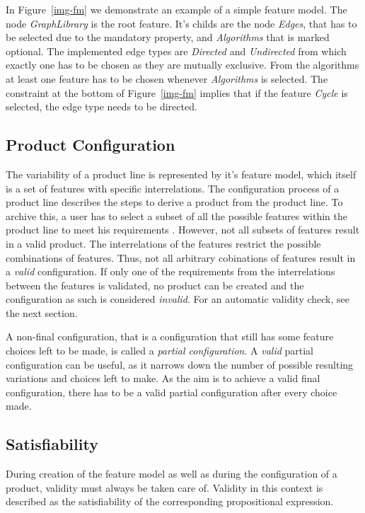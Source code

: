 In Figure~\ref{img-fm} we demonstrate an example of a simple feature model. The node \textit{GraphLibrary} is the root feature. It's childs are the node \textit{Edges}, that has to be selected due to the mandatory property, and \textit{Algorithms} that is marked optional. The implemented edge types are \textit{Directed} and \textit{Undirected} from which exactly one has to be chosen as they are mutually exclusive. From the algorithms at least one feature has to be chosen whenever \textit{Algorithms} is selected. The constraint at the bottom of Figure~\ref{img-fm} implies that if the feature \textit{Cycle} is selected, the edge type needs to be directed.


\subsection{Product Configuration}
The variability of a product line is represented by it's feature model, which itself is a set of features with specific interrelations. The configuration process of a product line describes the steps to derive a product from the product line. To archive this, a user has to select a subset of all the possible features within the product line to meet his requirements \cite{vrt}. However, not all subsets of features result in a valid product. The interrelations of the features restrict the possible combinations of features. Thus, not all arbitrary cobinations of features result in a \textit{valid} configuration. If only one of the requirements from the interrelations between the features is validated, no product can be created and the configuration as such is considered \textit{invalid}. For an automatic validity check, see the next section.

A non-final configuration, that is a configuration that still has some feature choices left to be made, is called a \textit{partial configuration}. A \textit{valid} partial configuration can be useful, as it narrows down the number of possible resulting variations and choices left to make. As the aim is to achieve a valid final configuration, there has to be a valid partial configuration after every choice made.


\subsection{Satisfiability} \label{ch:sat}
During creation of the feature model as well as during the configuration of a product, validity must always be taken care of. Validity in this context is described as the satisfiability of the corresponding propositional expression.

